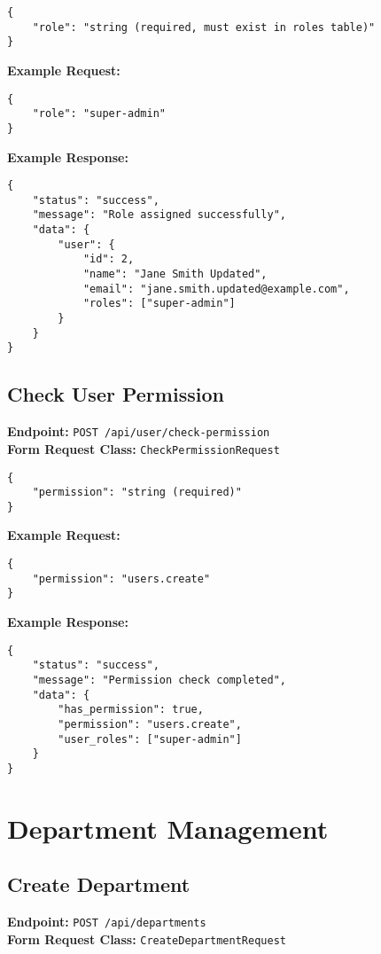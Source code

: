 \documentclass[12pt,a4paper]{article}
\begin{document}
\begin{lstlisting}[caption=Assign Role Request Body]
{
    "role": "string (required, must exist in roles table)"
}
\end{lstlisting}

\textbf{Example Request:}
\begin{lstlisting}[caption=Assign Role Example Request]
{
    "role": "super-admin"
}
\end{lstlisting}

\textbf{Example Response:}
\begin{lstlisting}[caption=Assign Role Example Response]
{
    "status": "success",
    "message": "Role assigned successfully",
    "data": {
        "user": {
            "id": 2,
            "name": "Jane Smith Updated",
            "email": "jane.smith.updated@example.com",
            "roles": ["super-admin"]
        }
    }
}
\end{lstlisting}

\subsection{Check User Permission}
\textbf{Endpoint:} \texttt{POST /api/user/check-permission}\\
\textbf{Form Request Class:} \texttt{CheckPermissionRequest}

\begin{lstlisting}[caption=Check Permission Request Body]
{
    "permission": "string (required)"
}
\end{lstlisting}

\textbf{Example Request:}
\begin{lstlisting}[caption=Check Permission Example Request]
{
    "permission": "users.create"
}
\end{lstlisting}

\textbf{Example Response:}
\begin{lstlisting}[caption=Check Permission Example Response]
{
    "status": "success",
    "message": "Permission check completed",
    "data": {
        "has_permission": true,
        "permission": "users.create",
        "user_roles": ["super-admin"]
    }
}
\end{lstlisting}

\section{Department Management}

\subsection{Create Department}
\textbf{Endpoint:} \texttt{POST /api/departments}\\
\textbf{Form Request Class:} \texttt{CreateDepartmentRequest}
\end{document}
